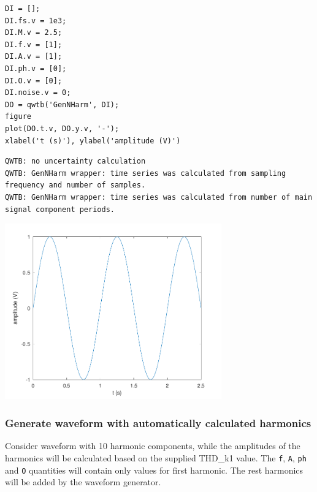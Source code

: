 \begin{lstlisting}
DI = [];
DI.fs.v = 1e3;
DI.M.v = 2.5;
DI.f.v = [1];
DI.A.v = [1];
DI.ph.v = [0];
DI.O.v = [0];
DI.noise.v = 0;
DO = qwtb('GenNHarm', DI);
figure
plot(DO.t.v, DO.y.v, '-');
xlabel('t (s)'), ylabel('amplitude (V)')
\end{lstlisting}
\begin{lstlisting}[language={},xleftmargin=5pt,frame=none]
QWTB: no uncertainty calculation
QWTB: GenNHarm wrapper: time series was calculated from sampling frequency and number of samples.
QWTB: GenNHarm wrapper: time series was calculated from number of main signal component periods.

\end{lstlisting}
\begin{center}
\includegraphics[width=0.7\textwidth]{algs_examples_published/GenNHarm_alg_example-2.pdf}
\end{center}


{}
\subsubsection*{Generate waveform with automatically calculated harmonics}



Consider waveform with 10 harmonic components, while the amplitudes of the
harmonics will be calculated based on the supplied THD\_k1 value. The \texttt{f},
\texttt{A}, \texttt{ph} and \texttt{O} quantities will contain only values for first harmonic. The
rest harmonics will be added by the waveform generator.

